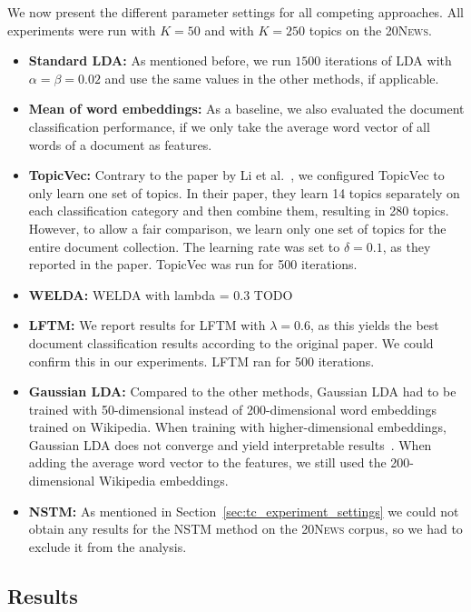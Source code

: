 \documentclass[
        a4paper,
        titlepage,
        twoside,
        parskip,
        numbers=noenddot
        ]{scrbook}
\theoremstyle{break}
\begin{document}
We now present the different parameter settings for all competing approaches.
All experiments were run with $K = 50$ and with $K = 250$ topics on the \textsc{20News}.

\begin{itemize}
  \item
    \textbf{Standard LDA:}
    As mentioned before, we run $1500$ iterations of LDA with $\alpha = \beta = 0.02$ and use the same values in the other methods, if applicable.
  \item
    \textbf{Mean of word embeddings:}
    As a baseline, we also evaluated the document classification performance, if we only take the average word vector of all words of a document as features.
  \item
    \textbf{TopicVec:}
    Contrary to the paper by Li et al.~\cite{Li2016}, we configured TopicVec to only learn one set of topics.
    In their paper, they learn 14 topics separately on each classification category and then combine them, resulting in 280 topics.
    However, to allow a fair comparison, we learn only one set of topics for the entire document collection.
    The learning rate was set to $\delta = 0.1$, as they reported in the paper.
    TopicVec was run for 500 iterations.
  \item
    \textbf{WELDA:}
    WELDA with lambda = 0.3 TODO
  \item
    \textbf{LFTM:}
    We report results for LFTM with $\lambda = 0.6$, as this yields the best document classification results according to the original paper.
    We could confirm this in our experiments.
    LFTM ran for 500 iterations.
  \item
    \textbf{Gaussian LDA:}
    Compared to the other methods, Gaussian LDA had to be trained with 50-dimensional instead of 200-dimensional word embeddings trained on Wikipedia.
    When training with higher-dimensional embeddings, Gaussian LDA does not converge and yield interpretable results~\cite{Das2016}.
    When adding the average word vector to the features, we still used the 200-dimensional Wikipedia embeddings.
  \item
    \textbf{NSTM:}
    As mentioned in Section~\ref{sec:tc_experiment_settings} we could not obtain any results for the NSTM method on the \textsc{20News} corpus, so we had to exclude it from the analysis.
\end{itemize}

\subsection{Results}
\end{document}
